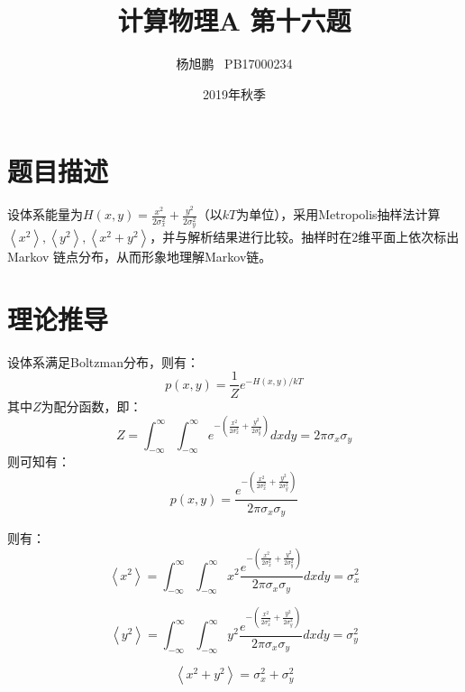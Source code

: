 \documentclass[a4paper,11pt]{article}
\author{ 杨旭鹏  \  PB17000234}
\date{2019年秋季}
\title{计算物理A 第十六题}
\begin{document}
\maketitle
\tableofcontents

\section{题目描述}
设体系能量为$H(x,y) = \frac{x^{2}}{2\sigma_{x}^{2}} + \frac{y^{2}}{2\sigma_{y}^{2}}$（以$kT$为单位），采用Metropolis抽样法计算 $\left < x^{2}  \right > , \left < y^{2}  \right > , \left < x^{2} + y^{2}  \right > $，并与解析结果进行比较。抽样时在2维平面上依次标出Markov 链点分布，从而形象地理解Markov链。

\section{理论推导}
设体系满足Boltzman分布，则有：
\begin{equation}
	p(x,y) = \frac{1}{Z} e^{  -H(x,y)/kT }
\end{equation}
其中$Z$为配分函数，即：
\begin{equation}
	Z = \int_{-\infty}^{\infty} \int_{-\infty}^{\infty} e^{ - \left(   \frac{x^{2}}{2\sigma_{x}^{2}} + \frac{y^{2}}{2\sigma_{y}^{2}}  \right) } dx dy = 2\pi \sigma_{x} \sigma_{y}
\end{equation}
则可知有：
\begin{equation}
	p(x,y) = \frac{e^{  -   \left(   \frac{x^{2}}{2\sigma_{x}^{2}} + \frac{y^{2}}{2\sigma_{y}^{2}}  \right)  }}{2\pi \sigma_{x} \sigma_{y}}
\end{equation}

则有：
\begin{equation}
	\left < x^{2}  \right > =  \int_{-\infty}^{\infty} \int_{-\infty}^{\infty}  x^{2} \frac{e^{  -   \left(   \frac{x^{2}}{2\sigma_{x}^{2}} + \frac{y^{2}}{2\sigma_{y}^{2}}  \right)  }}{2\pi \sigma_{x} \sigma_{y}} dx dy = \sigma_{x}^{2}
\end{equation}

\begin{equation}
	\left < y^{2}  \right > =  \int_{-\infty}^{\infty} \int_{-\infty}^{\infty}  y^{2} \frac{e^{  -   \left(   \frac{x^{2}}{2\sigma_{x}^{2}} + \frac{y^{2}}{2\sigma_{y}^{2}}  \right)  }}{2\pi \sigma_{x} \sigma_{y}} dx dy = \sigma_{y}^{2}
\end{equation}

\begin{equation}
	\left < x^{2} + y^{2}  \right > = \sigma_{x}^{2} + \sigma_{y}^{2}
\end{equation}
\end{document}

